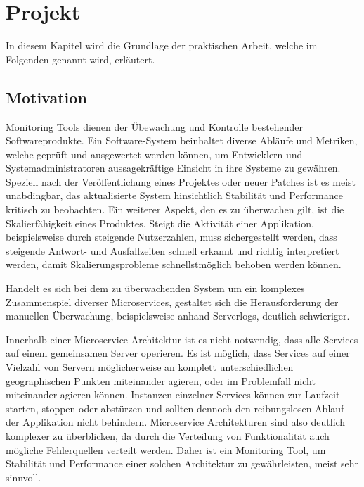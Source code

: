 
\chapter{Projekt \projectname{}}

In diesem Kapitel wird die Grundlage der praktischen Arbeit, welche im Folgenden \projectname{} genannt wird, erläutert.

\section{Motivation}
\label{sec:motivation}

Monitoring Tools dienen der Übewachung und Kontrolle bestehender Softwareprodukte.
Ein Software-System beinhaltet diverse Abläufe und Metriken, welche geprüft und ausgewertet werden können, um Entwicklern und Systemadministratoren
aussagekräftige Einsicht in ihre Systeme zu gewähren. Speziell nach der Veröffentlichung eines Projektes oder neuer Patches
ist es meist unabdingbar, das aktualisierte System hinsichtlich Stabilität und Performance kritisch zu beobachten. Ein weiterer Aspekt, den es zu überwachen gilt,
ist die Skalierfähigkeit eines Produktes. Steigt die Aktivität einer Applikation, beispielsweise durch steigende Nutzerzahlen,
muss sichergestellt werden, dass steigende Antwort- und Ausfallzeiten schnell erkannt und richtig interpretiert werden, damit Skalierungsprobleme schnellstmöglich behoben werden können.

Handelt es sich bei dem zu überwachenden System um ein komplexes Zusammenspiel diverser Microservices, gestaltet sich die Herausforderung der manuellen Überwachung, beispielsweise anhand
Serverlogs, deutlich schwieriger.

Innerhalb einer Microservice Architektur ist es nicht notwendig, dass alle Services auf einem gemeinsamen Server operieren.
Es ist möglich, dass Services auf einer Vielzahl von Servern möglicherweise an komplett unterschiedlichen geographischen Punkten miteinander agieren,
oder im Problemfall nicht miteinander agieren können. Instanzen einzelner Services können zur Laufzeit starten, stoppen oder abstürzen
und sollten dennoch den reibungslosen Ablauf der Applikation nicht behindern. Microservice Architekturen sind also deutlich komplexer zu überblicken, da durch die Verteilung von Funktionalität auch
mögliche Fehlerquellen verteilt werden.
Daher ist ein Monitoring Tool, um Stabilität und Performance einer solchen Architektur zu gewährleisten, meist sehr sinnvoll.

